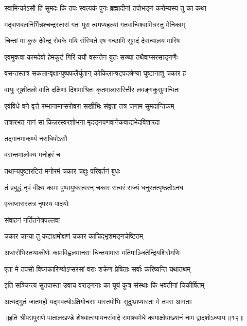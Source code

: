 \twolineshloka
{स्वामिन्कोऽसौ हि सुमदः किं तपः स्वल्पकं पुनः}
{ब्रह्मादीनां तपोभङ्गं करोम्यस्य तु का कथा}%

\twolineshloka
{मद्बाणबलनिर्भिन्नश्चन्द्रस्तारां गतः पुरा}
{त्वमप्यहल्यां गतवान्विश्वामित्रस्तु मेनिकाम्}%

\twolineshloka
{चिन्तां मा कुरु देवेन्द्र सेवके मयि संस्थिते}
{एष गच्छामि सुमदं देवान्पालय मारिष}%

\twolineshloka
{एवमुक्त्वा कामदेवो हेमकूटं गिरिं ययौ}
{वसन्तेन युतः सख्या तथैवाप्सरसाङ्गणैः}%

\twolineshloka
{वसन्तस्तत्र सकलान्वृक्षान्पुष्पफलैर्युतान्}
{कोकिलान्षट्पदश्रेण्या घुष्टानाशु चकार ह}%

\twolineshloka
{वायुः सुशीतलो वाति दक्षिणां दिशमाश्रितः}
{कृतमालासरित्तीर लवङ्गकुसुमान्वितः}%

\twolineshloka
{एवंविधे वने वृत्ते रम्भानामाप्सरोवरा}
{सखीभिः संवृता तत्र जगाम सुमदान्तिकम्}%

\twolineshloka
{तत्रारभत गानं सा किन्नरस्वरशोभना}
{मृदङ्गपणवानेकवाद्यभेदविशारदा}%

तद्गानमाकर्ण्य नराधिपोऽसौ

वसन्तमालोक्य मनोहरं च

\twolineshloka
{तथान्यपुष्टारटितं मनोरमं}
{चकार चक्षुः परिवर्तनं बुधः}%

\twolineshloka
{तं प्रबुद्धं नृपं वीक्ष्य कामः पुष्पायुधस्त्वरन्}
{चकार सत्वरं सज्यं धनुस्तत्पृष्ठतोऽनघ}%

एकाप्सरास्तत्र नृपस्य पादयोः

संवाहनं नर्तितनेत्रपल्लवा

\twolineshloka
{चकार चान्या तु कटाक्षमोक्षणं}
{चकार काचिद्भृशमङ्गचेष्टितम्}%

\twolineshloka
{अप्सरोभिस्तथाकीर्णः कामविह्वलमानसः}
{चिन्तयामास मतिमाञ्जितेन्द्रियशिरोमणिः}%

\twolineshloka
{एता मे तपसो विघ्नकारिण्योऽप्सरसां वराः}
{शक्रेण प्रेषिताः सर्वाः करिष्यन्ति यथातथम्}%

\twolineshloka
{इति सञ्चिन्त्य सुतपास्ता उवाच वराङ्गनाः}
{का यूयं कुत्र संस्थाः किं भवतीनां चिकीर्षितम्}%

\twolineshloka
{अत्यद्भुतं जातमहो यद्भवत्योऽक्षिगोचराः}
{यास्तपोभिः सुदुष्प्राप्यास्ता मे तपस आगताः}%

॥इति श्रीपद्मपुराणे पातालखण्डे शेषवात्स्यायनसंवादे रामाश्वमेधे कामाक्षोपाख्यानं नाम द्वादशोऽध्यायः॥१२॥



